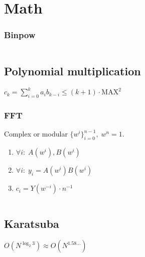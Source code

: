\section{Math}

\subsubsection{Binpow}
\inputminted{cpp}{../code/math/binpow.cpp}

\subsection{Polynomial multiplication}
$c_k=\displaystyle\sum_{i=0}^ka_ib_{k-i}\le(k+1)\cdot\text{MAX}^2$

\subsubsection{FFT}
Complex or modular $\{w^i\}_{i=0}^{n-1},\;w^n=1$.
\begin{enumerate}
\item $\forall i:\;A(w^i),B(w^i)$
\item $\forall i:\;y_i=A(w^i)B(w^i)$
\item $c_i=Y(w^{-i})\cdot n^{-1}$
\end{enumerate}
\inputminted{cpp}{../code/math/fft.cpp}

\subsection{Karatsuba}
$O(N^{\log_2 3})\approx O(N^{1.58\dots})$
\inputminted{cpp}{../code/math/karatsuba.cpp}